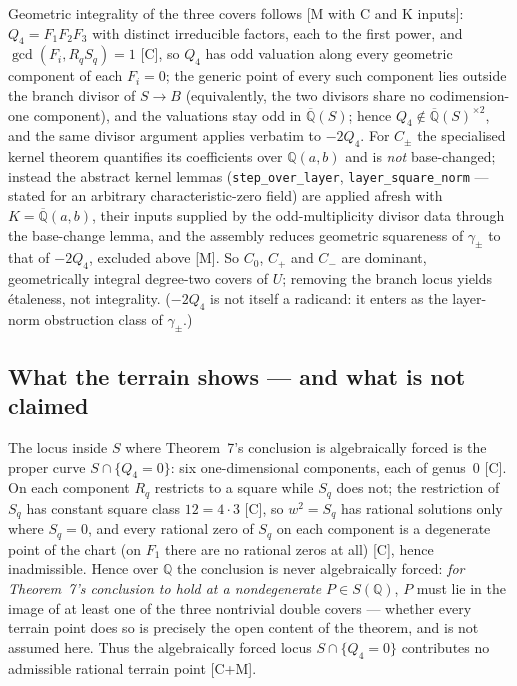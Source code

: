 \documentclass[11pt]{amsart}
\newcommand{\Q}{\mathbb{Q}}
\begin{document}
Geometric integrality of the three covers follows [M with C and K
inputs]: $Q_{4}=F_{1}F_{2}F_{3}$ with distinct irreducible factors,
each to the first power, and $\gcd(F_{i},R_{q}S_{q})=1$ [C], so
$Q_{4}$ has odd valuation along every geometric component of each
$F_{i}=0$; the generic point of every such component lies outside the
branch divisor of $S\to B$ (equivalently, the two divisors share no
codimension-one component), and the valuations stay odd in
$\overline{\Q}(S)$; hence
$Q_{4}\notin\overline{\Q}(S)^{\times2}$, and the same divisor argument
applies verbatim to $-2Q_{4}$.  For $C_{\pm}$ the specialised kernel
theorem quantifies its coefficients over $\Q(a,b)$ and is \emph{not}
base-changed; instead the abstract kernel lemmas
(\texttt{step\_over\_layer}, \texttt{layer\_square\_norm} --- stated
for an arbitrary characteristic-zero field) are applied afresh with
$K=\overline{\Q}(a,b)$, their inputs supplied by the odd-multiplicity
divisor data through the base-change lemma, and the assembly reduces
geometric squareness of $\gamma_{\pm}$ to that of $-2Q_{4}$, excluded
above [M].  So $C_{0}$, $C_{+}$ and $C_{-}$ are dominant,
geometrically integral degree-two covers of $U$; removing the branch
locus yields \'etaleness, not integrality.  ($-2Q_{4}$ is not itself a
radicand: it enters as the layer-norm obstruction class of
$\gamma_{\pm}$.)

\subsection{What the terrain shows --- and what is not claimed}
\label{sec:boundary:reading}

The locus inside $S$ where Theorem~7's conclusion is algebraically
forced is the proper curve $S\cap\{Q_{4}=0\}$: six one-dimensional
components, each of genus~$0$ [C].  On each component $R_{q}$ restricts
to a square while $S_{q}$ does not; the restriction of $S_{q}$ has
constant square class $12=4\cdot 3$ [C], so $w^{2}=S_{q}$ has rational
solutions only where $S_{q}=0$, and every rational zero of $S_{q}$ on
each component is a degenerate point of the chart (on $F_{1}$ there are
no rational zeros at all) [C], hence inadmissible.  Hence over $\Q$ the
conclusion is never algebraically forced: \emph{for Theorem~7's conclusion to hold
at a nondegenerate $P\in S(\Q)$}, $P$ must lie in the image of at least
one of the three nontrivial double covers --- whether every terrain
point does so is precisely the open content of the theorem, and is not
assumed here.  Thus the algebraically forced locus $S\cap\{Q_{4}=0\}$ contributes
no admissible rational terrain point [C+M].
\end{document}
